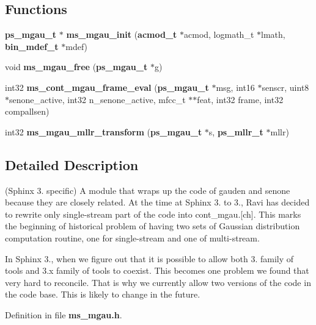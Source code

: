 \subsection*{Functions}
\begin{DoxyCompactItemize}
\item 
{\bf ps\-\_\-mgau\-\_\-t} $\ast$ {\bfseries ms\-\_\-mgau\-\_\-init} ({\bf acmod\-\_\-t} $\ast$acmod, logmath\-\_\-t $\ast$lmath, {\bf bin\-\_\-mdef\-\_\-t} $\ast$mdef)\label{ms__mgau_8h_a7dbdcb8e1901665b955e324eefdfeea3}

\item 
void {\bfseries ms\-\_\-mgau\-\_\-free} ({\bf ps\-\_\-mgau\-\_\-t} $\ast$g)\label{ms__mgau_8h_ae553fda1fe6082d50cb95b06a85b2be6}

\item 
int32 {\bfseries ms\-\_\-cont\-\_\-mgau\-\_\-frame\-\_\-eval} ({\bf ps\-\_\-mgau\-\_\-t} $\ast$msg, int16 $\ast$senscr, uint8 $\ast$senone\-\_\-active, int32 n\-\_\-senone\-\_\-active, mfcc\-\_\-t $\ast$$\ast$feat, int32 frame, int32 compallsen)\label{ms__mgau_8h_ab1f5637b68fdc1a4d24e4d6275353216}

\item 
int32 {\bfseries ms\-\_\-mgau\-\_\-mllr\-\_\-transform} ({\bf ps\-\_\-mgau\-\_\-t} $\ast$s, {\bf ps\-\_\-mllr\-\_\-t} $\ast$mllr)\label{ms__mgau_8h_ad3fe464ff15e735bfef15e628c5433fc}

\end{DoxyCompactItemize}


\subsection{Detailed Description}
(Sphinx 3. specific) A module that wraps up the code of gauden and senone because they are closely related. At the time at Sphinx 3. to 3., Ravi has decided to rewrite only single-\/stream part of the code into cont\-\_\-mgau.[ch]. This marks the beginning of historical problem of having two sets of Gaussian distribution computation routine, one for single-\/stream and one of multi-\/stream.

In Sphinx 3., when we figure out that it is possible to allow both 3. family of tools and 3.\-x family of tools to coexist. This becomes one problem we found that very hard to reconcile. That is why we currently allow two versions of the code in the code base. This is likely to change in the future. 

Definition in file {\bf ms\-\_\-mgau.\-h}.

